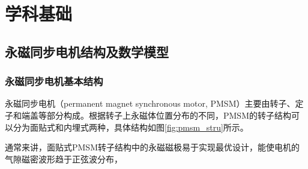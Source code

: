 \chapter{学科基础}
\section{永磁同步电机结构及数学模型}
\subsection{永磁同步电机基本结构}
永磁同步电机（permanent magnet synchronous motor, PMSM）主要由转子、定子和端盖等部分构成。根据转子上永磁体位置分布的不同，PMSM的转子结构可以分为面贴式和内埋式两种，具体结构如图\ref{fig:pmsm_stru}所示。


通常来讲，面贴式PMSM转子结构中的永磁磁极易于实现最优设计，能使电机的气隙磁密波形趋于正弦波分布，
